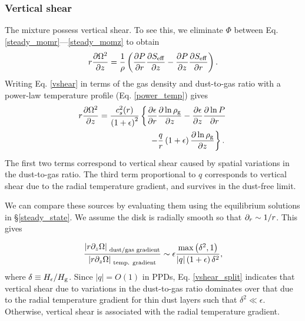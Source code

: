 \subsubsection{Vertical shear}\label{vertshear}
The mixture possess vertical shear. To see this, we eliminate $\Phi$
between Eq. \ref{steady_momr}---\ref{steady_momz} to 
obtain 
\begin{align}\label{vshear}
  r\frac{\partial \Omega^2}{\partial z} 
   = \frac{1}{\rho}\left(\frac{\partial P}{\partial r}\frac{\partial S_\mathrm{eff}}{\partial z} -\frac{\partial
    P}{\partial z}\frac{\partial S_\mathrm{eff}}{\partial r} \right). 
\end{align}
Writing Eq. \ref{vshear} in terms of the gas density and dust-to-gas
ratio with a power-law temperature profile (Eq. \ref{power_temp}) gives 
\begin{align}\label{vshear2}
  &r\frac{\p \Omega^2}{\p z}  =
  \frac{c_s^2(r)}{\left(1+\epsilon\right)^2}\left\{
  \frac{\p\epsilon}{\p r}\frac{\p\ln{\rhog}}{\p z}
 -\frac{\p\epsilon}{\p z}\frac{\p\ln{P}}{\p r}\right.\notag\\
  &\phantom{ r\frac{\p \Omega^2}{\p z}  =
    \frac{c_s^2(r)}{\left(1+\epsilon\right)^2}\left\{\right\} }
  \left. -\frac{q}{r} \left(1+\epsilon\right)\frac{\p\ln{\rhog}}{\p z}
  \right\}. 
\end{align}
The first two terms correspond to vertical shear caused by spatial
variations in the dust-to-gas ratio. The third term
proportional to $q$ corresponds to vertical shear due to the 
radial temperature gradient, and survives in the dust-free limit. 

We can compare these sources by 
evaluating them using the equilibrium
solutions in \S\ref{steady_state}. We assume the disk is radially
smooth so that $\partial_r\sim 1/r$. %
This gives 

\begin{align}\label{vshear_split}
  \frac{\left|r\partial_z\Omega\right|_{\text{
        dust/gas gradient}}}{\left|r\partial_z\Omega\right|_{\text{
        temp. gradient}}} \sim
 \epsilon \frac{\mathrm{max}\left(\delta^2,
    1\right)}{\left|q\right|\left(1+\epsilon\right)\delta^2},
\end{align}
where $\delta\equiv H_\epsilon/H_\mathrm{g}$. 
Since $|q|=O(1)$ in PPDs, Eq. \ref{vshear_split} indicates that
vertical shear due to variations in the dust-to-gas ratio dominates 
over that due to the radial temperature gradient for thin dust layers
such that $\delta^2\ll \epsilon$. Otherwise, vertical shear is
associated with the radial temperature gradient. %






